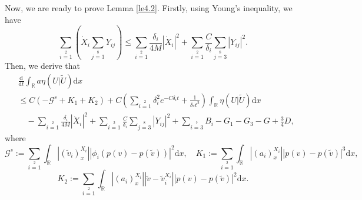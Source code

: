 \documentclass[10pt,reqno]{amsart}
\numberwithin{equation}{section}
\newcommand{\dif}{\mathrm{d}}
\begin{document}
Now, we are ready to prove Lemma \ref{le4.2}. Firstly, using Young's inequality, we have
\[
\sum\limits_{i=1}\limits^2\left(\dot{X}_i\sum\limits_{j=3}\limits^8Y_{ij}\right)\le
\sum\limits_{i=1}\limits^2\frac{\delta_i}{4M}|\dot{X}_i|^2
+\sum\limits_{i=1}\limits^2\frac{C}{\delta_i}\sum\limits_{j=3}\limits^8|Y_{ij}|^2.
\]
Then, we derive that
\begin{align*}
&\frac{\dif}{\dif t}\int_\mathbb{R}a\eta(U|\widetilde{U})\dif x \\ &\le C(-\mathcal{G}^s+K_1+K_2)
+C\left(\sum\limits_{i=1}\limits^2\delta_i^2e^{-C\delta_i t}+\frac{1}{\delta_\ast t^2}\right)\int_\mathbb{R}\eta(U|\widetilde{U})\dif x\\
&\quad-\sum\limits_{i=1}\limits^2\frac{\delta_i}{4M}|\dot{X}_i|^2
+\sum\limits_{i=1}\limits^2\frac{C}{\delta_i}\sum\limits_{j=3}\limits^8|Y_{ij}|^2
+\sum\limits_{i=3}\limits^7B_i-G_1-G_3-G+\frac{3}{4}D,
\end{align*}
where
\[
\mathcal{G}^s:=\sum\limits_{i=1}\limits^2
\int_\mathbb{R}|(\widetilde{v}_i)^{X_i}_x||\phi_i(p(v)-p(\widetilde{v}))|^2\dif x,\quad
K_1:=\sum\limits_{i=1}\limits^2
\int_\mathbb{R}|(a_i)^{X_i}_x||p(v)-p(\widetilde{v})|^3\dif x,
\]
\[
K_2:=\sum\limits_{i=1}\limits^2
\int_\mathbb{R}|(a_i)^{X_i}_x||\widetilde{v}-\widetilde{v}_i^{X_i}||p(v)-p(\widetilde{v})|^2\dif x.
\]
\end{document}
